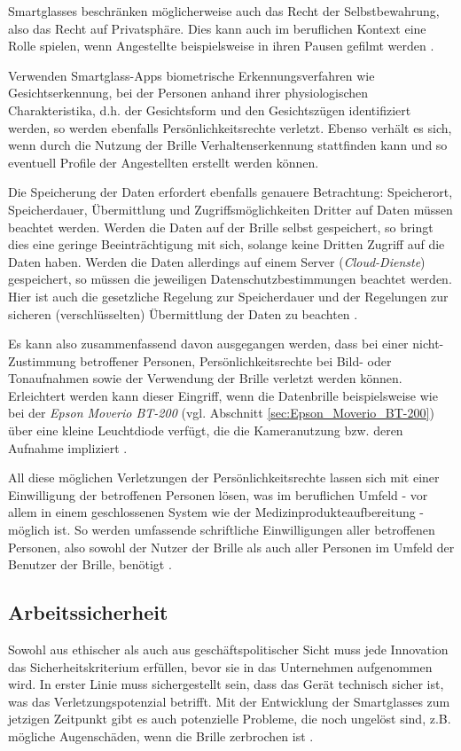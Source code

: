 Smartglasses beschränken möglicherweise auch das Recht der Selbstbewahrung, also das Recht auf Privatsphäre. Dies kann auch im beruflichen Kontext eine Rolle spielen, wenn Angestellte beispielsweise in ihren Pausen gefilmt werden \cite[S.~114f]{Schwenke2016}.

Verwenden Smartglass-Apps biometrische Erkennungsverfahren wie Gesichtserkennung, bei der Personen anhand ihrer physiologischen Charakteristika, d.h. der Gesichtsform und den Gesichtszügen identifiziert werden, so werden ebenfalls Persönlichkeitsrechte verletzt. Ebenso verhält es sich, wenn durch die Nutzung der Brille Verhaltenserkennung stattfinden kann und so eventuell Profile der Angestellten erstellt werden können.

Die Speicherung der Daten erfordert ebenfalls genauere Betrachtung: Speicherort, Speicherdauer, Übermittlung und Zugriffsmöglichkeiten Dritter auf Daten müssen beachtet werden. Werden die Daten auf der Brille selbst gespeichert, so bringt dies eine geringe Beeinträchtigung mit sich, solange keine Dritten Zugriff auf die Daten haben. Werden die Daten allerdings auf einem Server (\emph{Cloud-Dienste}) gespeichert, so müssen die jeweiligen Datenschutzbestimmungen beachtet werden. Hier ist auch die gesetzliche Regelung zur Speicherdauer und der Regelungen zur sicheren (verschlüsselten) Übermittlung der Daten zu beachten \cite[S.~165f]{Schwenke2016}.

Es kann also zusammenfassend davon ausgegangen werden, dass bei einer nicht- Zustimmung betroffener Personen, Persönlichkeitsrechte bei Bild- oder Tonaufnahmen sowie der Verwendung der Brille verletzt werden können. Erleichtert werden kann dieser Eingriff, wenn die Datenbrille beispielsweise wie bei der \emph{Epson Moverio BT-200} (vgl. Abschnitt \ref{sec:Epson_Moverio_BT-200}) über eine kleine Leuchtdiode verfügt, die die Kameranutzung bzw. deren Aufnahme impliziert \cite[S.~161]{Schwenke2016}. 

All diese möglichen Verletzungen der Persönlichkeitsrechte lassen sich mit einer Einwilligung der betroffenen Personen lösen, was im beruflichen Umfeld - vor allem in einem geschlossenen System wie der Medizinprodukteaufbereitung - möglich ist. So werden umfassende schriftliche Einwilligungen aller betroffenen Personen, also sowohl der Nutzer der Brille als auch aller Personen im Umfeld der Benutzer der Brille, benötigt \cite[S.~139f]{Schwenke2016}.
%
%
%
%
%
%
%
\subsection{Arbeitssicherheit}
\label{sec:Arbeitssicherheit}
Sowohl aus ethischer als auch aus geschäftspolitischer Sicht muss jede Innovation das Sicherheitskriterium erfüllen, bevor sie in das Unternehmen aufgenommen wird. In erster Linie muss sichergestellt sein, dass das Gerät technisch sicher ist, was das Verletzungspotenzial betrifft. Mit der Entwicklung der Smartglasses zum jetzigen Zeitpunkt gibt es auch potenzielle Probleme, die noch ungelöst sind, z.B. mögliche Augenschäden, wenn die Brille zerbrochen ist \cite{Hein2016}.


